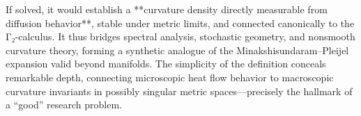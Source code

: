 If solved, it would establish a **curvature density directly measurable from diffusion behavior**, stable under metric limits, and connected canonically to the Γ₂-calculus. It thus bridges spectral analysis, stochastic geometry, and nonsmooth curvature theory, forming a synthetic analogue of the Minakshisundaram–Pleijel expansion valid beyond manifolds. The simplicity of the definition conceals remarkable depth, connecting microscopic heat flow behavior to macroscopic curvature invariants in possibly singular metric spaces—precisely the hallmark of a “good” research problem.
